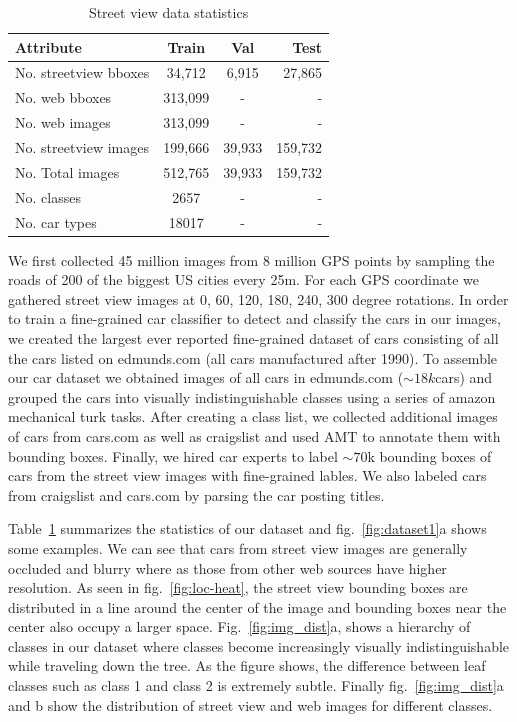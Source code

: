 \documentclass[10pt,twocolumn,letterpaper]{article}
\begin{document}
\begin{table}
\begin{center}
\begin{tabular}{|l|c|c|r|}
\hline
\textbf{Attribute} & \textbf{Train} & \textbf{Val} & \textbf{Test} \\
\hline\hline
No. streetview bboxes & 34,712 & 6,915 &27,865\\
No. web bboxes & 313,099 & - &-\\
No. web images & 313,099 & - &-\\
No. streetview images & 199,666 & 39,933 &159,732\\
No. Total images &512,765&39,933&159,732\\
No. classes & 2657 & - & -\\
No. car types & 18017 & - & -\\
\hline
\end{tabular}
\end{center}
\caption{Street view data statistics}
\label{table:data}
\end{table}
We first collected 45 million images from 8 million GPS points by sampling the roads of 200 of the biggest US cities every 25m. For each GPS coordinate we gathered street view images at 0, 60, 120, 180, 240, 300 degree rotations. In order to train a fine-grained car classifier to detect and classify the cars in our images, we created the largest ever reported fine-grained dataset of cars consisting of all the cars listed on edmunds.com (all cars manufactured after 1990). To assemble our car dataset we obtained images of all cars in edmunds.com (\(\sim18k\)cars) and grouped the cars into visually indistinguishable classes using a series of amazon mechanical turk tasks. After creating a class list, we collected additional images of cars from cars.com as well as craigslist and used AMT to annotate them with bounding boxes. Finally, we hired car experts to label \(\sim 70\)k bounding boxes of cars from the street view images with fine-grained lables. We also labeled cars from craigslist and cars.com by parsing the car posting titles. 

Table~\ref{table:data} summarizes the statistics of our dataset and fig.~\ref{fig:dataset1}a shows some examples. We can see that cars from street view images are generally occluded and blurry where as those from other web sources have higher resolution. As seen in fig.~\ref{fig:loc-heat}, the street view bounding boxes are distributed in a line around the center of the image and bounding boxes near the center also occupy a larger space. Fig.~\ref{fig:img_dist}a, shows a hierarchy of classes in our dataset where classes become increasingly visually indistinguishable while traveling down the tree. As the figure shows, the difference between leaf classes such as class 1 and class 2 is extremely subtle. Finally fig.~\ref{fig:img_dist}a and b show the distribution of street view and web images for different classes. 
\end{document}
